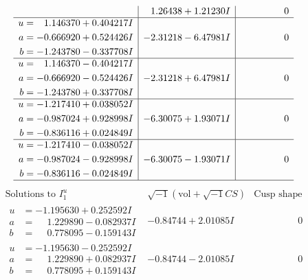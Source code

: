 \documentclass[1p]{elsarticle_modified}
\theoremstyle{definition}
\newcommand{\I}{\sqrt{-1}}
\begin{document}
$$\begin{array}{c|c|c}
 & \phantom{-}1.26438 + 1.21230 I & \phantom{-0.000000 } 0 \\ \hline\begin{aligned}
u &= \phantom{-}1.146370 + 0.404217 I \\
a &= -0.666920 + 0.524426 I \\
b &= -1.243780 - 0.337708 I\end{aligned}
 & -2.31218 - 6.47981 I & \phantom{-0.000000 } 0 \\ \hline\begin{aligned}
u &= \phantom{-}1.146370 - 0.404217 I \\
a &= -0.666920 - 0.524426 I \\
b &= -1.243780 + 0.337708 I\end{aligned}
 & -2.31218 + 6.47981 I & \phantom{-0.000000 } 0 \\ \hline\begin{aligned}
u &= -1.217410 + 0.038052 I \\
a &= -0.987024 + 0.928998 I \\
b &= -0.836116 + 0.024849 I\end{aligned}
 & -6.30075 + 1.93071 I & \phantom{-0.000000 } 0 \\ \hline\begin{aligned}
u &= -1.217410 - 0.038052 I \\
a &= -0.987024 - 0.928998 I \\
b &= -0.836116 - 0.024849 I\end{aligned}
 & -6.30075 - 1.93071 I & \phantom{-0.000000 } 0\\
 \hline 
 \end{array}$$\newpage$$\begin{array}{c|c|c}  
\text{Solutions to }I^u_{1}& \I (\text{vol} + \sqrt{-1}CS) & \text{Cusp shape}\\
 \hline 
\begin{aligned}
u &= -1.195630 + 0.252592 I \\
a &= \phantom{-}1.229890 - 0.082937 I \\
b &= \phantom{-}0.778095 - 0.159143 I\end{aligned}
 & -0.84744 + 2.01085 I & \phantom{-0.000000 } 0 \\ \hline\begin{aligned}
u &= -1.195630 - 0.252592 I \\
a &= \phantom{-}1.229890 + 0.082937 I \\
b &= \phantom{-}0.778095 + 0.159143 I\end{aligned}
 & -0.84744 - 2.01085 I & \phantom{-0.000000 } 0 \\ \hline\begin{aligned}

\end{aligned}
\end{array}$$
\end{document}
